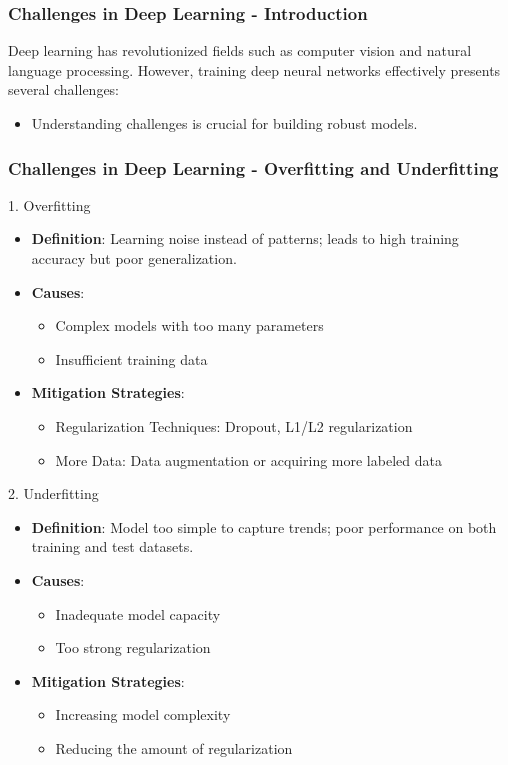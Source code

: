 \documentclass[aspectratio=169]{beamer}
\begin{document}
\begin{frame}[fragile]
  \frametitle{Challenges in Deep Learning - Introduction}
  Deep learning has revolutionized fields such as computer vision and natural language processing. However, training deep neural networks effectively presents several challenges:
  \begin{itemize}
      \item Understanding challenges is crucial for building robust models.
  \end{itemize}
\end{frame}

\begin{frame}[fragile]
  \frametitle{Challenges in Deep Learning - Overfitting and Underfitting}
  \begin{block}{1. Overfitting}
      \begin{itemize}
          \item \textbf{Definition}: Learning noise instead of patterns; leads to high training accuracy but poor generalization.
          \item \textbf{Causes}: 
          \begin{itemize}
              \item Complex models with too many parameters
              \item Insufficient training data
          \end{itemize}
          \item \textbf{Mitigation Strategies}:
          \begin{itemize}
              \item Regularization Techniques: Dropout, L1/L2 regularization
              \item More Data: Data augmentation or acquiring more labeled data
          \end{itemize}
      \end{itemize}
  \end{block}

  \begin{block}{2. Underfitting}
      \begin{itemize}
          \item \textbf{Definition}: Model too simple to capture trends; poor performance on both training and test datasets.
          \item \textbf{Causes}: 
          \begin{itemize}
              \item Inadequate model capacity
              \item Too strong regularization
          \end{itemize}
          \item \textbf{Mitigation Strategies}:
          \begin{itemize}
              \item Increasing model complexity
              \item Reducing the amount of regularization
          \end{itemize}
      \end{itemize}
  \end{block}
\end{frame}
\end{document}
